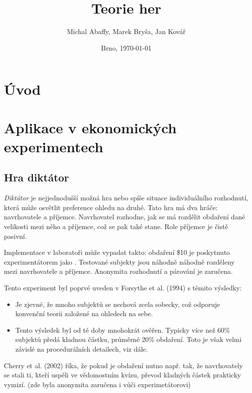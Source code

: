 \documentclass[a5paper,12pt]{article}
\title{Teorie her}
\author{Michal Abaffy, Marek Bryša, Jan Kovář}
\date{Brno, \today}
\begin{document}
  \maketitle
  \section{Úvod}
  \section{Aplikace v ekonomických experimentech}
    \subsection{Hra diktátor}
      \emph{Diktátor} je nejjednodušší možná hra nebo spíše situace individuálního rozhodnutí,
      která může osvětlit preference ohledu na druhé. Tato hra má dva hráče: navrhovatele a příjemce.
      Navrhovatel rozhodne, jak se má rozdělit obdaření dané velikosti mezi něho a příjemce,
      což se pak také stane. Role příjemce je čistě pasivní.

      Implementace v laboratoři může vypadat takto: obdaření \$10 je poskytnuto experimentátorem jako
      . Testované subjekty jsou náhodně náhodně rozděleny mezi navrhovatele a příjemce.
      Anonymita rozhodnutí a párování je zaručena.
        
      Tento experiment byl poprvé uveden v Forsythe et al. (1994) s těmito výsledky:
      \begin{itemize}
        \item
          Je zjevné, že mnoho subjektů se nechová zcela sobecky, což odporuje konvenční teorii založené na
          ohledech na sebe.
        \item
          Tento výsledek byl od té doby mnohokrát ověřen. Typicky více než 60\% subjektů předá kladnou částku,
          průměrné 20\% obdaření. Toto je však velmi závislé na procedurálních detailech, viz dále.
      \end{itemize}
      Cherry et al. (2002) říka, že pokud je obdaření nutno  např. tak, že navrhovately se stali ti,
      kteří uspěli ve vědomostním kvízu, převod kladných částek prakticky vymizí. (zde byla anonymita zaručena i
      vůči experimetátorovi)
      
\end{document}
